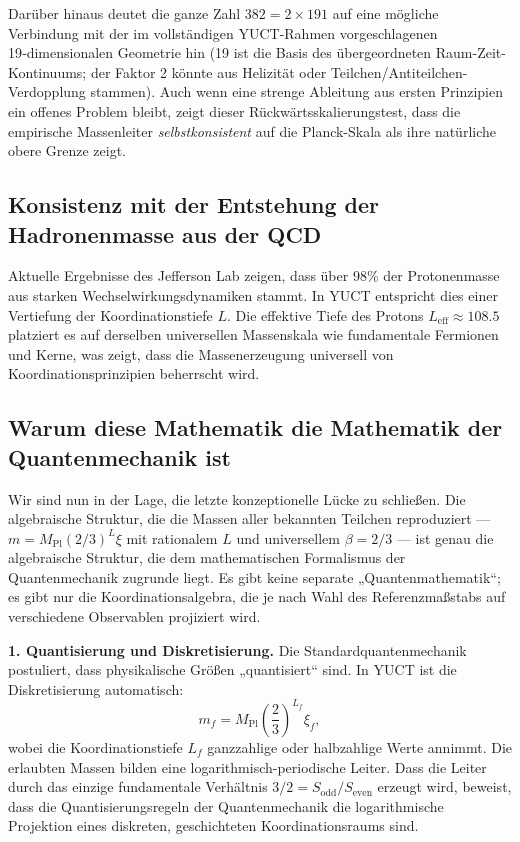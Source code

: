 \documentclass[11pt,a4paper]{article}
\begin{document}
	Darüber hinaus deutet die ganze Zahl $382 = 2 \times 191$ auf eine mögliche Verbindung mit der im vollständigen YUCT-Rahmen vorgeschlagenen 19‑dimensionalen Geometrie hin (19 ist die Basis des übergeordneten Raum-Zeit-Kontinuums; der Faktor 2 könnte aus Helizität oder Teilchen/Antiteilchen-Verdopplung stammen). Auch wenn eine strenge Ableitung aus ersten Prinzipien ein offenes Problem bleibt, zeigt dieser Rückwärtsskalierungstest, dass die empirische Massenleiter \emph{selbstkonsistent} auf die Planck-Skala als ihre natürliche obere Grenze zeigt.
	
	\subsection{Konsistenz mit der Entstehung der Hadronenmasse aus der QCD}
	
	Aktuelle Ergebnisse des Jefferson Lab zeigen, dass über 98\% der Protonenmasse aus starken Wechselwirkungsdynamiken stammt. In YUCT entspricht dies einer Vertiefung der Koordinationstiefe \(L\). Die effektive Tiefe des Protons \(L_{\mathrm{eff}} \approx 108.5\) platziert es auf derselben universellen Massenskala wie fundamentale Fermionen und Kerne, was zeigt, dass die Massenerzeugung universell von Koordinationsprinzipien beherrscht wird.
	
	\subsection{Warum diese Mathematik die Mathematik der Quantenmechanik ist}
	\label{subsec:QM-as-YUCT}
	
	Wir sind nun in der Lage, die letzte konzeptionelle Lücke zu schließen. Die algebraische Struktur, die die Massen aller bekannten Teilchen reproduziert — \(m = M_{\mathrm{Pl}}(2/3)^L\xi\) mit rationalem $L$ und universellem $\beta=2/3$ — ist genau die algebraische Struktur, die dem mathematischen Formalismus der Quantenmechanik zugrunde liegt. Es gibt keine separate „Quantenmathematik“; es gibt nur die Koordinationsalgebra, die je nach Wahl des Referenzmaßstabs auf verschiedene Observablen projiziert wird.
	
	\medskip
	\noindent\textbf{1. Quantisierung und Diskretisierung.}
	Die Standardquantenmechanik postuliert, dass physikalische Größen „quantisiert“ sind. In YUCT ist die Diskretisierung automatisch:
	\[
	m_f = M_{\mathrm{Pl}} \left( \frac{2}{3} \right)^{L_f} \xi_f,
	\]
	wobei die Koordinationstiefe $L_f$ ganzzahlige oder halbzahlige Werte annimmt. Die erlaubten Massen bilden eine logarithmisch-periodische Leiter. Dass die Leiter durch das einzige fundamentale Verhältnis $3/2 = S_{\mathrm{odd}}/S_{\mathrm{even}}$ erzeugt wird, beweist, dass die Quantisierungsregeln der Quantenmechanik die logarithmische Projektion eines diskreten, geschichteten Koordinationsraums sind.
	
\end{document}
